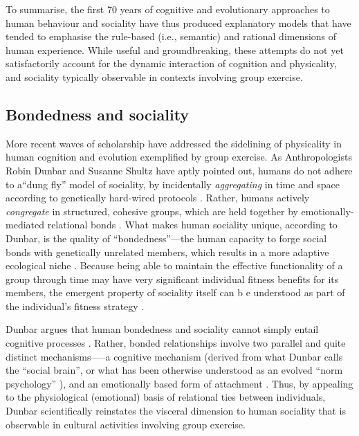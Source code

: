 \begin{CJK}{UTF8}{gbsn}
To summarise, the first 70 years of cognitive and evolutionary approaches to human behaviour and sociality have thus produced explanatory models that have tended to emphasise the rule-based (i.e., semantic) and rational dimensions of human experience.  While useful and groundbreaking, these attempts do not yet satisfactorily account for the dynamic interaction of cognition and physicality, and sociality typically observable in contexts involving group exercise.


\subsection{Bondedness and sociality\label{sect:bondednessSociality}}
More recent waves of scholarship have addressed the sidelining of physicality in human cognition and evolution exemplified by group exercise.  As Anthropologists Robin Dunbar and Susanne Shultz have aptly pointed out, humans do not adhere to a``dung fly'' model of sociality, by incidentally \textit{aggregating} in time and space according to genetically hard-wired protocols \citep[cf.][]{Wilson1975}.  Rather, humans actively \textit{congregate} in structured, cohesive groups, which are held together by emotionally-mediated relational bonds \citep[777]{Dunbar2010}.  What makes human sociality unique, according to Dunbar, is the quality of ``bondedness''---the human capacity to forge social bonds with genetically unrelated members, which results in a more adaptive ecological niche \citep[cf.][]{Odling-Smee2003}.
Because being able to maintain the effective functionality of a group through time may have very significant individual fitness benefits for its members, the emergent property of sociality itself can b e understood as part of the individual’s fitness strategy \citep{Dunbar2010b,Nowak2010}.

Dunbar argues that human bondedness and sociality cannot simply entail cognitive processes \citep[at least not in the way cognitive processes are narrowly rendered by game-theoretic and gene-culture coevolutionary models][]{Dunbar2010}.  Rather, bonded relationships involve two parallel and quite distinct mechanisms—--a cognitive mechanism (derived from what Dunbar calls the ``social brain''\citep{Dunbar1998}, or what has been otherwise understood as an evolved ``norm psychology'' \citep{Chudek2011}), and an emotionally based form of attachment \citep[often involving a psycho-pharmacological mechanism][]{Dunbar2010b}.  Thus, by appealing to the physiological (emotional) basis of relational ties between individuals, Dunbar scientifically reinstates the visceral dimension to human sociality that is observable in cultural activities involving group exercise.


\end{CJK}
